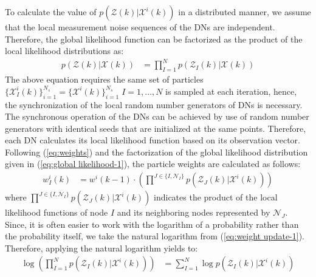 \documentclass[10pt,twocolumn,twoside]{IEEEtran}
\begin{document}
To calculate the value of $p\left(\mathcal{Z}(k)|\mathcal{X}^{i}\left(k\right)\right)$
in a distributed manner, we assume that the local measurement noise
sequences of the DNs are independent. Therefore, the global likelihood
function can be factorized as the product of the local likelihood
distributions \cite{hlinka2013distributed,coates2004distributed,sheng2005distributed}
as: 
\begin{equation}
\begin{aligned}p(\mathcal{Z}(k)|\mathcal{X}(k)) & =\prod_{I=1}^{N}p(\mathcal{Z}_{I}(k)|\mathcal{X}(k))\end{aligned}
\label{eq:global likelihood-1}
\end{equation}
The above equation requires the same set of particles $\{\mathcal{X}_{I}^{i}(k)\}_{i=1}^{N_{s}}=\{\mathcal{X}^{i}(k)\}_{i=1}^{N_{s}}\; I=1,\ldots,N$
is sampled at each iteration, hence, the synchronization of the local
random number generators of DNs is necessary. The synchronous operation
of the DNs can be achieved by use of random number generators with
identical seeds that are initialized at the same points. Therefore,
each DN calculates its local likelihood function based on its observation
vector. Following (\ref{eq:weights}) and the factorization of the
global likelihood distribution given in (\ref{eq:global likelihood-1}),
the particle weights are calculated as follows:
\begin{equation}
\begin{aligned}w_{I}^{i}(k) & =w^{i}(k-1)\cdot\left(\prod^{J\in\{I,\mathcal{N}_{I}\}}p(\mathcal{Z}_{J}(k)|\mathcal{X}^{i}(k))\right)\end{aligned}
\label{eq:weight update-1}
\end{equation}
where {\small{}$\prod^{J\in\{I,\mathcal{N}_{I}\}}p(\mathcal{Z}_{J}(k)|\mathcal{X}^{i}(k))$}
indicates the product of the local likelihood functions of node $I$
and its neighboring nodes represented by $\mathcal{N}_{J}$. Since,
it is often easier to work with the logarithm of a probability rather
than the probability itself, we take the natural logarithm from (\ref{eq:weight update-1}).
Therefore, applying the natural logarithm \cite{hlinka2013distributed}
yields to:
\begin{equation}
\begin{aligned}\log\left(\prod_{I=1}^{N}p(\mathcal{Z}_{I}(k)|\mathcal{X}^{i}(k))\right) & =\sum_{I=1}^{N}\log p(\mathcal{Z}_{I}(k)|\mathcal{X}^{i}(k))\end{aligned}
\label{eq:logarithm}
\end{equation}
\end{document}
